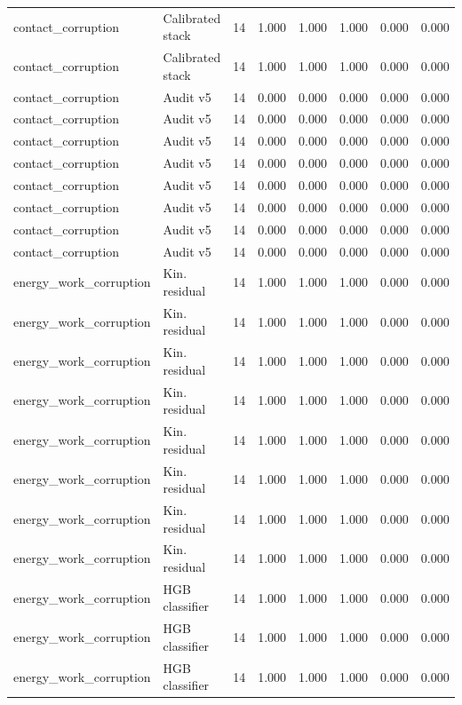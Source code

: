 {\begin{longtable}{llrrrrrr}
contact\_corruption & Calibrated stack & 14 & 1.000 & 1.000 & 1.000 & 0.000 & 0.000 \\
contact\_corruption & Calibrated stack & 14 & 1.000 & 1.000 & 1.000 & 0.000 & 0.000 \\
contact\_corruption & Audit v5 & 14 & 0.000 & 0.000 & 0.000 & 0.000 & 0.000 \\
contact\_corruption & Audit v5 & 14 & 0.000 & 0.000 & 0.000 & 0.000 & 0.000 \\
contact\_corruption & Audit v5 & 14 & 0.000 & 0.000 & 0.000 & 0.000 & 0.000 \\
contact\_corruption & Audit v5 & 14 & 0.000 & 0.000 & 0.000 & 0.000 & 0.000 \\
contact\_corruption & Audit v5 & 14 & 0.000 & 0.000 & 0.000 & 0.000 & 0.000 \\
contact\_corruption & Audit v5 & 14 & 0.000 & 0.000 & 0.000 & 0.000 & 0.000 \\
contact\_corruption & Audit v5 & 14 & 0.000 & 0.000 & 0.000 & 0.000 & 0.000 \\
contact\_corruption & Audit v5 & 14 & 0.000 & 0.000 & 0.000 & 0.000 & 0.000 \\
energy\_work\_corruption & Kin. residual & 14 & 1.000 & 1.000 & 1.000 & 0.000 & 0.000 \\
energy\_work\_corruption & Kin. residual & 14 & 1.000 & 1.000 & 1.000 & 0.000 & 0.000 \\
energy\_work\_corruption & Kin. residual & 14 & 1.000 & 1.000 & 1.000 & 0.000 & 0.000 \\
energy\_work\_corruption & Kin. residual & 14 & 1.000 & 1.000 & 1.000 & 0.000 & 0.000 \\
energy\_work\_corruption & Kin. residual & 14 & 1.000 & 1.000 & 1.000 & 0.000 & 0.000 \\
energy\_work\_corruption & Kin. residual & 14 & 1.000 & 1.000 & 1.000 & 0.000 & 0.000 \\
energy\_work\_corruption & Kin. residual & 14 & 1.000 & 1.000 & 1.000 & 0.000 & 0.000 \\
energy\_work\_corruption & Kin. residual & 14 & 1.000 & 1.000 & 1.000 & 0.000 & 0.000 \\
energy\_work\_corruption & HGB classifier & 14 & 1.000 & 1.000 & 1.000 & 0.000 & 0.000 \\
energy\_work\_corruption & HGB classifier & 14 & 1.000 & 1.000 & 1.000 & 0.000 & 0.000 \\
energy\_work\_corruption & HGB classifier & 14 & 1.000 & 1.000 & 1.000 & 0.000 & 0.000 \\

\end{longtable}}
